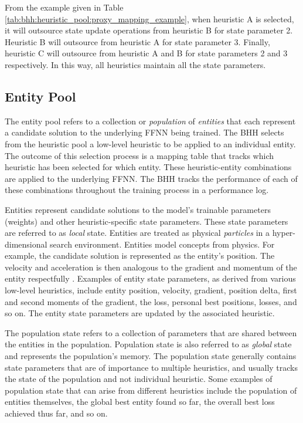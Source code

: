 \documentclass[preprint,review,12pt]{elsarticle}
\begin{document}
From the example given in Table \ref{tab:bhh:heuristic_pool:proxy_mapping_example}, when heuristic A is selected, it will outsource state update operations from heuristic B for state parameter 2. Heuristic B will outsource from heuristic A for state parameter 3. Finally, heuristic C will outsource from heuristic A and B for state parameters 2 and 3 respectively. In this way, all heuristics maintain all the state parameters.

\subsection{Entity Pool}\label{sec:bhh:entity_pool}

The entity pool refers to a collection or \textit{population} of \textit{entities} that each represent a candidate solution to the underlying \acs{FFNN} being trained. The \acs{BHH} selects from the heuristic pool a low-level heuristic to be applied to an individual entity. The outcome of this selection process is a mapping table that tracks which heuristic has been selected for which entity. These heuristic-entity combinations are applied to the underlying \acs{FFNN}. The \acs{BHH} tracks the performance of each of these combinations throughout the training process in a performance log.

Entities represent candidate solutions to the model's trainable parameters (weights) and other heuristic-specific state parameters. These state parameters are referred to as \textit{local} state. Entities are treated as physical \textit{particles} in a hyper-dimensional search environment. Entities model concepts from physics. For example, the candidate solution is represented as the entity's position. The velocity and acceleration is then analogous to the gradient and momentum of the entity respectfully \cite{ref:eberhart:1995}. Examples of entity state parameters, as derived from various low-level heuristics, include entity position, velocity, gradient, position delta, first and second moments of the gradient, the loss, personal best positions, losses, and so on. The entity state parameters are updated by the associated heuristic.

The population state refers to a collection of parameters that are shared between the entities in the population. Population state is also referred to as \textit{global} state and represents the population's memory. The population state generally contains state parameters that are of importance to multiple heuristics, and usually tracks the state of the population and not individual heuristic. Some examples of population state that can arise from different heuristics include the population of entities themselves, the global best entity found so far, the overall best loss achieved thus far, and so on.
\end{document}
